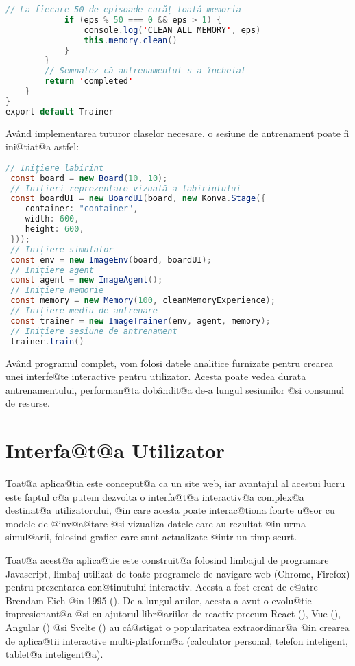 \begin{lstlisting}[language=Java, caption={Structura clasei Trainer}]
            // La fiecare 50 de episoade curăț toată memoria
            if (eps % 50 === 0 && eps > 1) {
                console.log('CLEAN ALL MEMORY', eps)
                this.memory.clean()
            }
        }
        // Semnalez că antrenamentul s-a încheiat
        return 'completed'
    }
}
export default Trainer
\end{lstlisting}

Av\^ and implementarea tuturor claselor necesare, o sesiune de antrenament poate fi ini@tiat@a astfel:

\begin{lstlisting}[language=Java, caption={Inițierea unei sesiuni complete de antrenament}]
 // Inițiere labirint
 const board = new Board(10, 10);
 // Inițieri reprezentare vizuală a labirintului
 const boardUI = new BoardUI(board, new Konva.Stage({
	container: "container",
	width: 600,
	height: 600,
 }));
 // Inițiere simulator
 const env = new ImageEnv(board, boardUI);
 // Inițiere agent
 const agent = new ImageAgent();
 // Inițiere memorie
 const memory = new Memory(100, cleanMemoryExperience);
 // Inițiere mediu de antrenare
 const trainer = new ImageTrainer(env, agent, memory);
 // Inițiere sesiune de antrenament
 trainer.train()
\end{lstlisting}

Av\^ and programul complet, vom folosi datele analitice furnizate pentru crearea unei interfe@te interactive pentru utilizator. Acesta poate vedea durata antrenamentului, performan@ta dob\^ andit@a de-a lungul sesiunilor @si consumul de resurse.

\section{Interfa@t@a Utilizator}

Toat@a aplica@tia este conceput@a ca un site web, iar avantajul al acestui lucru este faptul c@a putem dezvolta o interfa@t@a interactiv@a complex@a destinat@a utilizatorului, @in care acesta poate interac@tiona foarte u@sor cu modele de @inv@a@tare @si vizualiza datele care au rezultat @in urma simul@arii, folosind grafice care sunt actualizate @intr-un timp scurt.

Toat@a acest@a aplica@tie este construit@a folosind limbajul de programare Javascript, limbaj utilizat de toate programele de navigare web (Chrome, Firefox) pentru pre\-zen\-ta\-rea con@tinutului interactiv. Acesta a fost creat de c@atre Brendam Eich @in 1995 (\cite{netscape}). De-a lungul anilor, acesta a avut o evolu@tie impresionant@a @si cu ajutorul libr@ariilor de reactiv precum React (\cite{React}), Vue (\cite{Vue}), Angular (\cite{Angular}) @si Svelte (\cite{Svelte}) au c\^ a@stigat o popularitatea extraordinar@a @in crearea de aplica@tii interactive multi-platform@a (calculator personal, telefon inteligent, tablet@a inteligent@a).

